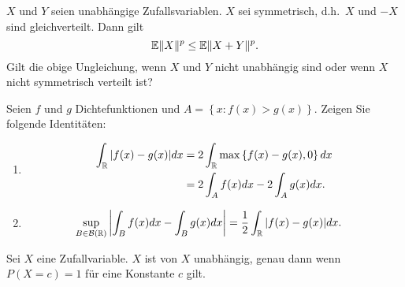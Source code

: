 


$X$ und $Y$ seien unabhängige Zufallsvariablen. $X$ sei symmetrisch, 
d.h.\ $X$ und $-X$ sind gleichverteilt. Dann gilt
\begin{equation}
    \mathbb{E} \| X \|^p \leq \mathbb{E} \| X + Y \|^p.
\end{equation}
Gilt die obige Ungleichung, wenn $X$ und $Y$ nicht unabhängig sind oder wenn 
$X$ nicht symmetrisch verteilt ist?




 Seien $f$ und $g$
Dichtefunktionen und $A = \left\{ x : f(x)>g(x) \right\}$. 
Zeigen Sie folgende Identitäten:
\begin{enumerate}
    \item \begin{align*}
            \int_{\mathbb R} |f(x)-g(x)| dx &= 2 \int_{\mathbb R} \max\left\{ f(x)-g(x), 0 \right\} dx \\
            &= 2 \int_{A} f(x)dx - 2 \int_{A} g(x)dx.
        \end{align*}
    \item \begin{align*}
            \sup_{B\in\mathcal B(\mathbb{R})} \left| \int_{B} f(x)dx - \int_{B} g(x)dx \right| &=
            \frac{1}{2} \int_{\mathbb R} |f(x)-g(x)|dx.
        \end{align*}
\end{enumerate}


Sei $X$ eine Zufallvariable. $X$ ist von $X$ unabhängig, genau dann wenn
$P(X = c)=1$ für eine Konstante $c$ gilt. %

